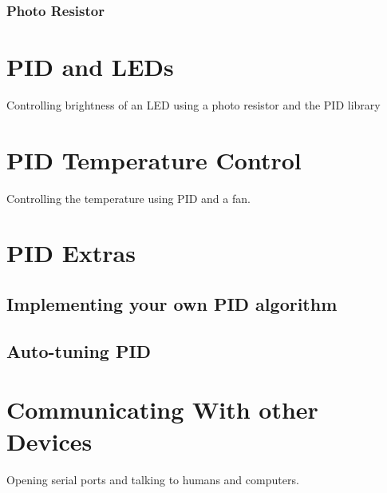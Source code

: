 \documentclass[11pt,a4paper]{article}
\begin{document}

\subsubsection{Photo Resistor} %
\label{sub:photo_resistor}






\section{PID and LEDs} %
\label{sec:pid_and_leds}

Controlling brightness of an LED using a photo resistor and the PID library


\section{PID Temperature Control} %
\label{sec:pid_temperature_control}

Controlling the temperature using PID and a fan.


\section{PID Extras} %
\label{sec:pid_extras}

\subsection{Implementing your own PID algorithm} %
\label{sub:implementing_your_own_pid_algorithm}

\subsection{Auto-tuning PID} %
\label{sub:auto-tuning_pid}




\section{Communicating With other Devices} %
\label{sec:communicating_with_other_devices}

Opening serial ports and talking to humans and computers.


 
 \nocite{*}
\end{document}
